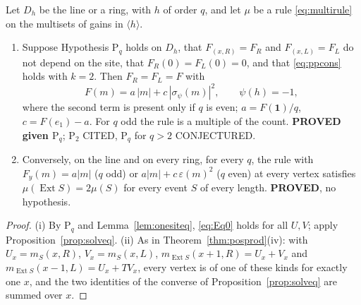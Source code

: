\begin{theorem}\label{thm:posprodq}
Let $D_h$ be the line or a ring, with $h$ of order $q$, and let $\mu$ be a rule \eqref{eq:multirule} on the multisets of gains in $\langle h\rangle$.
\begin{enumerate}[label=(\roman*)]
\item Suppose Hypothesis $\mathrm{P}_q$ holds on $D_h$, that $F_{(x,R)}=F_R$ and $F_{(x,L)}=F_L$ do not depend on the site, that $F_R(0)=F_L(0)=0$, and that \eqref{eq:ppcons} holds with $k=2$. Then $F_R=F_L=F$ with
\[
F(m)=a\,|m|+c\,|\sigma_\psi(m)|^2 ,\qquad \psi(h)=-1,
\]
where the second term is present only if $q$ is even; $a=F(\mathbf{1})/q$, $c=F(e_1)-a$. For $q$ odd the rule is a multiple of the count. \textbf{PROVED given $\mathrm{P}_q$}; $\mathrm{P}_2$ CITED, $\mathrm{P}_q$ for $q>2$ CONJECTURED.
\item Conversely, on the line and on every ring, for every $q$, the rule with $F_y(m)=a|m|$ ($q$ odd) or $a|m|+c\,\varepsilon(m)^2$ ($q$ even) at every vertex satisfies $\mu(\operatorname{Ext}S)=2\mu(S)$ for every event $S$ of every length. \textbf{PROVED}, no hypothesis.
\end{enumerate}
\end{theorem}
\begin{proof}
(i) By $\mathrm{P}_q$ and Lemma~\ref{lem:onesiteq}, \eqref{eq:Eq0} holds for all $U,V$; apply Proposition~\ref{prop:solveq}. (ii) As in Theorem~\ref{thm:posprod}(iv): with $U_x=m_S(x,R)$, $V_x=m_S(x,L)$, $m_{\operatorname{Ext}S}(x+1,R)=U_x+V_x$ and $m_{\operatorname{Ext}S}(x-1,L)=U_x+TV_x$, every vertex is of one of these kinds for exactly one $x$, and the two identities of the converse of Proposition~\ref{prop:solveq} are summed over $x$.
\end{proof}

